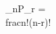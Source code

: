 \documentclass[preview]{standalone}
\begin{document}
\begin{center}
{}_nP_r = \\frac{n!}{(n-r)!}
\end{center}
\end{document}
